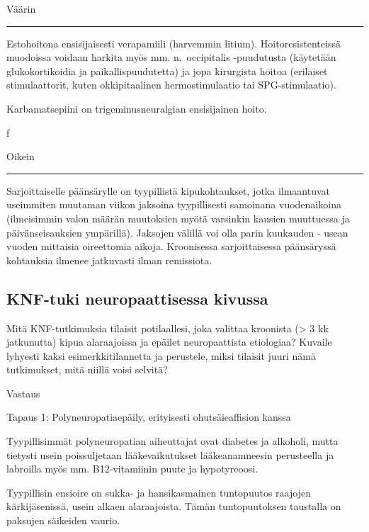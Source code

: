 \documentclass[
]{book}
\begin{document}
Väärin

\begin{center}\rule{0.5\linewidth}{0.5pt}\end{center}

Estohoitona ensisijaisesti verapamiili (harvemmin litium). Hoitoresistenteissä muodoissa voidaan harkita myös mm. n.~occipitalis -puudutusta (käytetään glukokortikoidia ja paikallispuudutetta) ja jopa kirurgista hoitoa (erilaiset stimulaattorit, kuten okkipitaalinen hermostimulaatio tai SPG-stimulaatio).

Karbamatsepiini on trigeminusneuralgian ensisijainen hoito.

f

Oikein

\begin{center}\rule{0.5\linewidth}{0.5pt}\end{center}

Sarjoittaiselle päänsärylle on tyypillistä kipukohtaukset, jotka ilmaantuvat useimmiten muutaman viikon jaksoina tyypillisesti samoinana vuodenaikoina (ilmeisimmin valon määrän muutoksien myötä varsinkin kausien muuttuessa ja päivänseisauksien ympärillä). Jaksojen välillä voi olla parin kuukauden - usean vuoden mittaisia oireettomia aikoja. Kroonisessa sarjoittaisessa päänsäryssä kohtauksia ilmenee jatkuvasti ilman remissiota.

\subsection{KNF-tuki neuropaattisessa kivussa}\label{knf-tuki-neuropaattisessa-kivussa}

Mitä KNF-tutkimuksia tilaisit potilaallesi, joka valittaa kroonista (\textgreater{} 3 kk jatkunutta) kipua alaraajoissa ja epäilet neuropaattista etiologiaa? Kuvaile lyhyesti kaksi esimerkkitilannetta ja perustele, miksi tilaisit juuri nämä tutkimukset, mitä niillä voisi selvitä?

Vastaus

Tapaus 1: Polyneuropatiaepäily, erityisesti ohutsäieaffision kanssa

Tyypillisimmät polyneuropatian aiheuttajat ovat diabetes ja alkoholi, mutta tietysti usein poissuljetaan lääkevaikutukset lääkeanamneesin perusteella ja labroilla myös mm. B12-vitamiinin puute ja hypotyreoosi.

Tyypillisin ensioire on sukka- ja hansikasmainen tuntopuutos raajojen kärkijäsenissä, usein alkaen alaraajoista. Tämän tuntopuutoksen taustalla on paksujen säikeiden vaurio.
\end{document}

